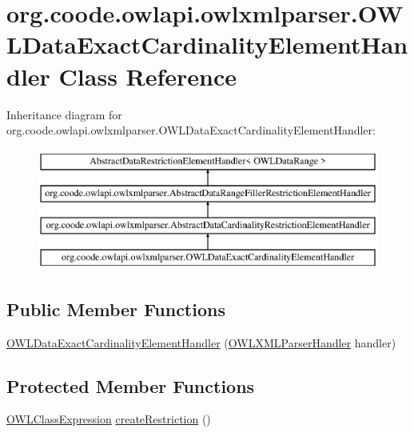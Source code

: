 \hypertarget{classorg_1_1coode_1_1owlapi_1_1owlxmlparser_1_1_o_w_l_data_exact_cardinality_element_handler}{\section{org.\-coode.\-owlapi.\-owlxmlparser.\-O\-W\-L\-Data\-Exact\-Cardinality\-Element\-Handler Class Reference}
\label{classorg_1_1coode_1_1owlapi_1_1owlxmlparser_1_1_o_w_l_data_exact_cardinality_element_handler}
}
Inheritance diagram for org.\-coode.\-owlapi.\-owlxmlparser.\-O\-W\-L\-Data\-Exact\-Cardinality\-Element\-Handler\-:\begin{figure}[H]
\begin{center}
\leavevmode
\includegraphics[height=4.000000cm]{classorg_1_1coode_1_1owlapi_1_1owlxmlparser_1_1_o_w_l_data_exact_cardinality_element_handler}
\end{center}
\end{figure}
\subsection*{Public Member Functions}
\begin{DoxyCompactItemize}
\item 
\hyperlink{classorg_1_1coode_1_1owlapi_1_1owlxmlparser_1_1_o_w_l_data_exact_cardinality_element_handler_a23101af9ef43fdba5ac009fc797f0c4b}{O\-W\-L\-Data\-Exact\-Cardinality\-Element\-Handler} (\hyperlink{classorg_1_1coode_1_1owlapi_1_1owlxmlparser_1_1_o_w_l_x_m_l_parser_handler}{O\-W\-L\-X\-M\-L\-Parser\-Handler} handler)
\end{DoxyCompactItemize}
\subsection*{Protected Member Functions}
\begin{DoxyCompactItemize}
\item 
\hyperlink{interfaceorg_1_1semanticweb_1_1owlapi_1_1model_1_1_o_w_l_class_expression}{O\-W\-L\-Class\-Expression} \hyperlink{classorg_1_1coode_1_1owlapi_1_1owlxmlparser_1_1_o_w_l_data_exact_cardinality_element_handler_aed7f9886c9f6f7be91768c51b1d21009}{create\-Restriction} ()
\end{DoxyCompactItemize}


